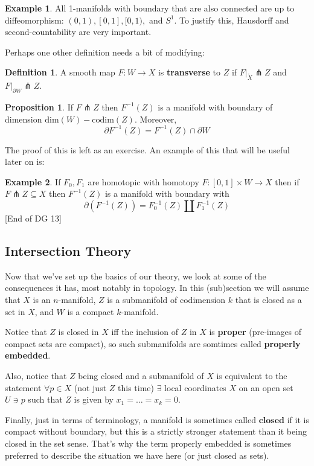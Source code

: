 \documentclass{article}
\theoremstyle{definition}
\newtheorem{definition}{Definition}
\newtheorem{proposition}{Proposition}
\newtheorem{example}{Example}
\begin{document}
\begin{example}
All 1-manifolds with boundary that are also connected are up to diffeomorphism:
$(0, 1), [0, 1], [0, 1), $ and $S^1$. To justify this, Hausdorff and
second-countability are very important. 
\end{example}

Perhaps one other definition needs a bit of modifying:

\begin{definition}
  A smooth map $F : W \to X$ is \textbf{transverse} to $Z$ if $F|_{\mathring{X}}
  \pitchfork Z$ and $F|_{\partial W} \pitchfork Z$.
\end{definition}

\begin{proposition}
  If $F \pitchfork Z$ then $F^{-1}(Z)$ is a manifold with boundary of
  dimension $\text{dim}(W) - \text{codim}(Z)$. Moreover,
  $$ \partial F^{-1}(Z) = F^{-1}(Z) \cap \partial W $$
\end{proposition}

The proof of this is left as an exercise. An example of this that will be useful
later on is:

\begin{example}
  If $F_0, F_1$ are homotopic with homotopy $F: [0, 1] \times W \to X$ then if
  $F \pitchfork Z \subseteq X$ then $F^{-1}(Z)$ is a manifold with boundary with
  $$ \partial(F^{-1}(Z)) = F_0^{-1}(Z) \coprod F_1^{-1}(Z) $$
  [End of DG 13]
\end{example}

\subsection{Intersection Theory}

Now that we've set up the basics of our theory, we look at some of the
consequences it has, most notably in topology. In this (sub)section we will
assume that $X$ is an $n$-manifold, $Z$ is a submanifold of codimension $k$ that
is closed as a set in $X$, and $W$ is a compact $k$-manifold.

Notice that $Z$ is closed in $X$ iff the inclusion of $Z$
in $X$ is \textbf{proper} (pre-images of compact sets are compact), so such submanifolds
are somtimes called \textbf{properly embedded}.

Also, notice that $Z$ being closed and a submanifold of $X$ is equivalent to the
statement $\forall p \in X$ (not just $Z$ this time) $\exists$ local coordinates
$X$ on an open set $U \ni p$ such that $Z$ is given by $x_1 = \dots = x_k = 0$.

Finally, just in terms of terminology, a manifold is sometimes called
$\textbf{closed}$ if it is compact without boundary, but this is a strictly
stronger statement than it being closed in the set sense. That's why the term
properly embedded is sometimes preferred to describe the situation we have here
(or just closed as sets).
\end{document}
